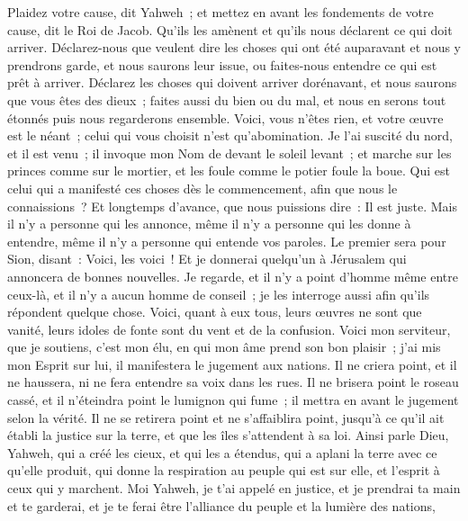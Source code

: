 \begin{multicols}{2}
Plaidez votre cause, dit Yahweh~; et mettez en avant les fondements de votre cause, dit le Roi de Jacob.
Qu'ils les amènent et qu'ils nous déclarent ce qui doit arriver. Déclarez-nous que veulent dire les choses qui ont été auparavant et nous y prendrons garde, et nous saurons leur issue, ou faites-nous entendre ce qui est prêt à arriver.
Déclarez les choses qui doivent arriver dorénavant, et nous saurons que vous êtes des dieux~; faites aussi du bien ou du mal, et nous en serons tout étonnés puis nous regarderons ensemble.
Voici, vous n'êtes rien, et votre œuvre est le néant~; celui qui vous choisit n'est qu'abomination.
Je l'ai suscité du nord, et il est venu~; il invoque mon Nom de devant le soleil levant~; et marche sur les princes comme sur le mortier, et les foule comme le potier foule la boue.
Qui est celui qui a manifesté ces choses dès le commencement, afin que nous le connaissions~? Et longtemps d'avance, que nous puissions dire~: Il est juste. Mais il n'y a personne qui les annonce, même il n'y a personne qui les donne à entendre, même il n'y a personne qui entende vos paroles.
Le premier sera pour Sion, disant~: Voici, les voici~! Et je donnerai quelqu'un à Jérusalem qui annoncera de bonnes nouvelles.
Je regarde, et il n'y a point d'homme même entre ceux-là, et il n'y a aucun homme de conseil~; je les interroge aussi afin qu'ils répondent quelque chose.
Voici, quant à eux tous, leurs œuvres ne sont que vanité, leurs idoles de fonte sont du vent et de la confusion.
\VerseOne{}Voici mon serviteur, que je soutiens, c'est mon élu, en qui mon âme prend son bon plaisir~; j'ai mis mon Esprit sur lui, il manifestera le jugement aux nations.
Il ne criera point, et il ne haussera, ni ne fera entendre sa voix dans les rues.
Il ne brisera point le roseau cassé, et il n'éteindra point le lumignon qui fume~; il mettra en avant le jugement selon la vérité.
Il ne se retirera point et ne s'affaiblira point, jusqu'à ce qu'il ait établi la justice sur la terre, et que les îles s'attendent à sa loi.
Ainsi parle Dieu, Yahweh, qui a créé les cieux, et qui les a étendus, qui a aplani la terre avec ce qu'elle produit, qui donne la respiration au peuple qui est sur elle, et l'esprit à ceux qui y marchent.
Moi Yahweh, je t'ai appelé en justice, et je prendrai ta main et te garderai, et je te ferai être l'alliance du peuple et la lumière des nations,

\end{multicols}
